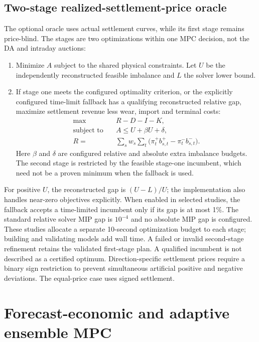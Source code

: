 \documentclass[11pt,a4paper]{article}
\begin{document}
\subsection{Two-stage realized-settlement-price oracle}
The optional oracle uses actual settlement curves, while its first stage remains
price-blind. The stages are two optimizations within one MPC decision, not the
DA and intraday auctions:
\begin{enumerate}
\item Minimize $A$ subject to the shared physical constraints. Let $U$ be the
independently reconstructed feasible imbalance and $L$ the solver lower bound.
\item If stage one meets the configured optimality criterion, or the explicitly
configured time-limit fallback has a qualifying reconstructed relative gap,
maximize settlement revenue less wear, import and terminal costs:
\begin{align}
 \max\quad &R-D-I-K,\\
 \text{subject to}\quad&A\le U+\beta U+\delta,\\
 R={}&\sum_s w_s\sum_t\bigl(\pi_t^+b^+_{s,t}-\pi_t^-b^-_{s,t}\bigr).
\end{align}
Here $\beta$ and $\delta$ are configured relative and absolute extra
imbalance budgets. The second stage is restricted by the feasible stage-one
incumbent, which need not be a proven minimum when the fallback is used.
\end{enumerate}
For positive $U$, the reconstructed gap is $(U-L)/U$; the implementation also
handles near-zero objectives explicitly. When enabled in selected studies, the
fallback accepts a time-limited incumbent only if its gap is at most 1\%.
The standard relative solver MIP gap is $10^{-4}$ and no absolute MIP gap is
configured. These studies allocate a separate 10-second optimization budget to
each stage; building and validating models add wall time. A failed or invalid
second-stage refinement retains the validated first-stage plan. A qualified
incumbent is not described as a certified optimum. Direction-specific settlement
prices require a binary sign restriction to prevent simultaneous artificial
positive and negative deviations. The equal-price case uses signed settlement.

\section{Forecast-economic and adaptive ensemble MPC}
\end{document}
